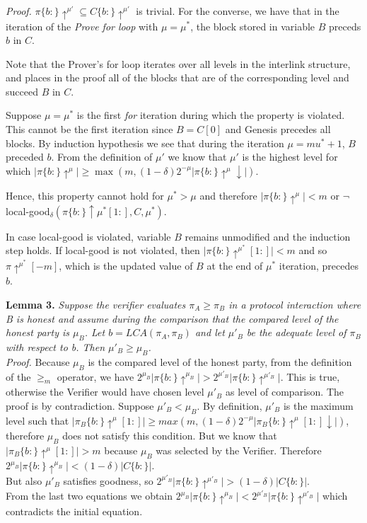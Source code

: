 \documentclass[9pt,a4paper]{article}
\begin{document}
\textit{Proof.} $ \pi\{b:\}\uparrow^{\mu'} \subseteq C\{b:\}\uparrow^{\mu'}$ is trivial. For the converse, we have that in the iteration of the \emph{Prove for loop}\cite{NIPoPoWs} with $\mu = \mu^*$, the block stored in variable $B$ preceds $b$ in $C$.

Note that the Prover's for loop iterates over all levels in the interlink structure, and places in the proof all of the blocks that are of the corresponding level and succeed $B$ in $C$. 

Suppose $\mu = \mu^*$ is the first \emph{for} iteration during which the property is violated. This cannot be the first iteration since $B = C[0]$ and Genesis precedes all blocks. By induction hypothesis we see that during the iteration $\mu = mu^* + 1$, $B$ preceded $b$. From the definition of $\mu'$ we know that $\mu'$ is the highest level for which $\vert \pi\{b:\}\uparrow^{\mu} \vert \geq \max( m, (1-\delta)2^{-\mu} \vert \pi\{b:\}\uparrow^{\mu}\downarrow \vert ) $. 

Hence, this property cannot hold for $\mu^* > \mu$ and therefore $\vert \pi\{b:\}\uparrow^{\mu} \vert < m$ or $\neg$local-good$_\delta(\pi\{b: \}\uparrow \mu^*[1:], C, \mu^*)$.

In case local-good is violated, variable $B$ remains unmodified and the induction step holds. If local-good is not violated, then $ \vert \pi\{b:\} \uparrow^{\mu^*}[1:] \vert < m$ and so $\pi\uparrow^{\mu^*}[-m]$, which is the updated value of $B$ at the end of $\mu^*$ iteration, precedes $b$.

\textbf{Lemma 3.} \textit{Suppose the verifier evaluates $\pi_A \geq \pi_B$ in a protocol interaction where B is honest and assume during the comparison that the compared level of the honest party is $\mu_B$. Let $b = LCA(\pi_A, \pi_B)$ and let ${\mu}'_B$ be the adequate level of $\pi_B$ with respect to b. Then ${\mu}'_B \geq \mu_B$.}\\

\textit{Proof.} Because $\mu_B$ is the compared level of the honest party, from the definition of the $\geq_m$ operator, we have $2^{\mu_B} \vert \pi\{b:\}\uparrow^{\mu_B} \vert > 2^{{\mu}'_B} \vert \pi\{b:\}\uparrow^{{\mu}'_B} \vert $. This is true, otherwise the Verifier would have chosen level $\mu'_B$ as level of comparison. The proof is by contradiction. Suppose $\mu'_B < \mu_B$. 
By definition, $\mu'_B$ is the maximum level such that $\vert \pi_B\{b:\}\uparrow^\mu [1:] \vert \geq max(m, (1-\delta)2^{-\mu}\vert \pi_B\{b:\}\uparrow^\mu [1:]\downarrow \vert)$, 
therefore $\mu_B$ does not satisfy this condition. 
But we know that $\vert \pi_B\{b:\}\uparrow^\mu [1:] \vert > m$ because $\mu_B$ was selected by the Verifier. 
Therefore $ 2^{\mu_B} \vert \pi\{b:\}\uparrow^{\mu_B} \vert < (1-\delta)\vert C\{b:\}\vert $. \\
But also $\mu'_B$ satisfies goodness, so $ 2^{\mu'_B} \vert \pi\{b:\}\uparrow^{\mu'_B} \vert > (1-\delta)\vert C\{b:\}\vert $.\\ From the last two equations we obtain $ 2^{\mu_B} \vert \pi\{b:\}\uparrow^{\mu_B} \vert < 2^{\mu'_B} \vert \pi\{b:\}\uparrow^{\mu'_B} \vert$ which contradicts the initial equation.\\
\end{document}

